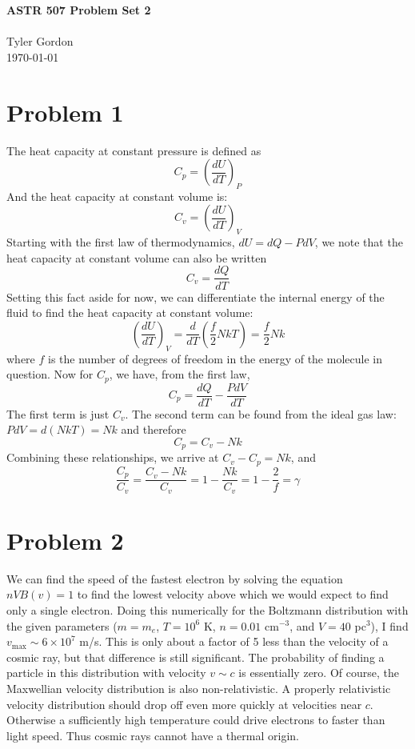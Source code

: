 \documentclass[a4paper, 11pt]{article}
\newcommand{\mytitle}{ASTR 507 Problem Set 2}
\begin{document}
\noindent
\large\textbf{\mytitle} \\ \\ Tyler Gordon \\
\normalsize \today 
\ \ \hrulefill

\section*{Problem 1}
	The heat capacity at constant pressure is defined as
	\begin{equation*}
		C_p = \left(\frac{dU}{dT}\right)_P
	\end{equation*}
	And the heat capacity at constant volume is:
	\begin{equation*}
		C_v = \left(\frac{dU}{dT}\right)_V
	\end{equation*}
	Starting with the first law of thermodynamics, $dU = dQ - PdV$, we note that the heat capacity at constant volume can also 
	be written 
	\begin{equation*}
		C_v = \frac{dQ}{dT}
	\end{equation*}
	Setting this fact aside for now, we can differentiate the internal energy of the fluid to find the heat capacity at constant volume:
	\begin{equation*}
		 \left(\frac{dU}{dT}\right)_V = \frac{d}{dT}\left(\frac{f}{2}NkT\right) = \frac{f}{2}Nk
	\end{equation*}
	where $f$ is the number of degrees of freedom in the energy of the molecule in question. Now for $C_p$, we have, from the 
	first law, 
	\begin{equation*}
		C_p = \frac{dQ}{dT} - \frac{PdV}{dT}
	\end{equation*}
	The first term is just $C_v$. The second term can be found from the ideal gas law: $PdV = d(NkT) = Nk$ and therefore 
	\begin{equation*}
		C_p = C_v - Nk
	\end{equation*}
	Combining these relationships, we arrive at $C_v - C_p = Nk$, and 
	\begin{equation*}
		\frac{C_p}{C_v} = \frac{C_v - Nk}{C_v} = 1 - \frac{Nk}{C_v} = 1 - \frac{2}{f} = \gamma
	\end{equation*}
\section*{Problem 2}
	We can find the speed of the fastest electron by solving the equation $nVB(v) = 1$ to find the lowest velocity above 
	which we would expect to find only a single electron. Doing this numerically for the Boltzmann distribution with the 
	given parameters ($m = m_e$, $T = 10^6$ K, $n = 0.01$ cm$^{-3}$, and $V = 40$ pc$^3$), I 
	find $v_\text{max} \sim 6\times10^7$ m/s. This is only about a factor of 5 less than the velocity of a cosmic ray, but 
	that difference is still significant. The probability of finding a particle in this distribution with velocity $v \sim c$ is essentially 
	zero. Of course, the Maxwellian velocity distribution is also non-relativistic. A properly relativistic velocity distribution should 
	drop off even more quickly at velocities near $c$. Otherwise a sufficiently high temperature could drive electrons to faster 
	than light speed. Thus cosmic rays cannot have a thermal origin. 
\end{document}
